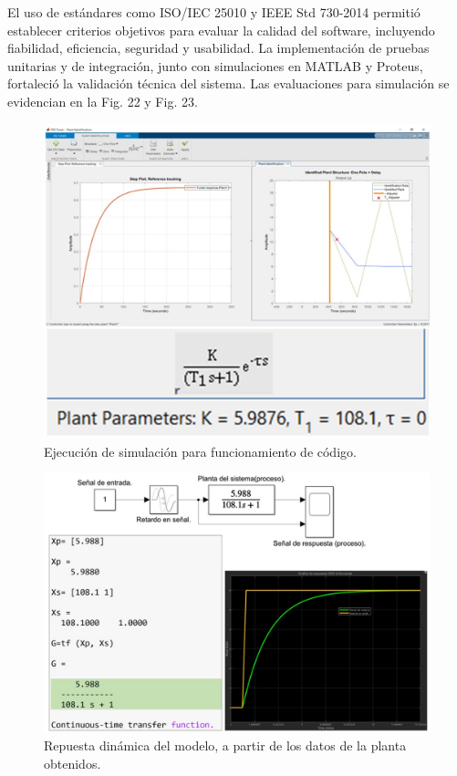 \documentclass[conference]{IEEEtran}
\begin{document}
	El uso de estándares como ISO/IEC 25010 y IEEE Std 730-2014 permitió establecer criterios objetivos para evaluar la calidad del software, incluyendo fiabilidad, eficiencia, seguridad y usabilidad. La implementación de pruebas unitarias y de integración, junto con simulaciones en MATLAB y Proteus, fortaleció la validación técnica del sistema. Las evaluaciones para simulación se evidencian en la Fig. 22 y Fig. 23.

	\begin{figure}[htbp]
	\centering
	\includegraphics[width=\columnwidth]{fig22.jpg}
	\caption{Ejecución de simulación para funcionamiento de código.}
	\end{figure}
	
	\begin{figure}[htbp]
	\centering
	\includegraphics[width=\columnwidth]{fig23.jpg}
	\caption{Repuesta dinámica del modelo, a partir de los datos de la planta obtenidos.}
	\end{figure}
	
\end{document}
